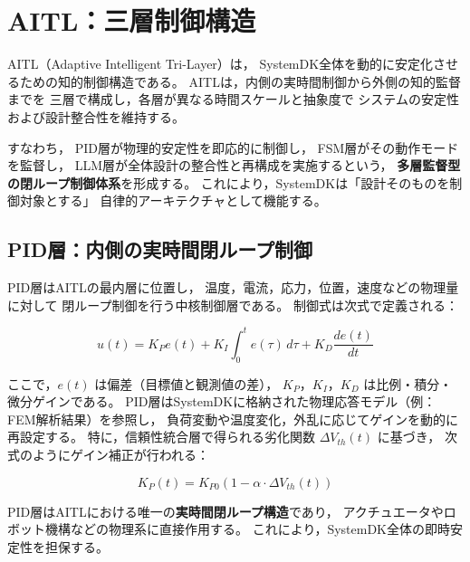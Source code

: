 \section{AITL：三層制御構造}

AITL（Adaptive Intelligent Tri-Layer）は，
SystemDK全体を動的に安定化させるための知的制御構造である。
AITLは，内側の実時間制御から外側の知的監督までを
三層で構成し，各層が異なる時間スケールと抽象度で
システムの安定性および設計整合性を維持する。

すなわち，
PID層が物理的安定性を即応的に制御し，
FSM層がその動作モードを監督し，
LLM層が全体設計の整合性と再構成を実施するという，
\textbf{多層監督型の閉ループ制御体系}を形成する。
これにより，SystemDKは「設計そのものを制御対象とする」
自律的アーキテクチャとして機能する。

\subsection{PID層：内側の実時間閉ループ制御}
PID層はAITLの最内層に位置し，
温度，電流，応力，位置，速度などの物理量に対して
閉ループ制御を行う中核制御層である。
制御式は次式で定義される：

\begin{equation}
u(t) = K_P e(t) + K_I \int_{0}^{t} e(\tau)\,d\tau + K_D \frac{de(t)}{dt}
\label{eq:PID}
\end{equation}

ここで，$e(t)$ は偏差（目標値と観測値の差），
$K_P$，$K_I$，$K_D$ は比例・積分・微分ゲインである。
PID層はSystemDKに格納された物理応答モデル（例：FEM解析結果）を参照し，
負荷変動や温度変化，外乱に応じてゲインを動的に再設定する。
特に，信頼性統合層で得られる劣化関数
$\Delta V_{th}(t)$ に基づき，
次式のようにゲイン補正が行われる：

\begin{equation}
K_P(t) = K_{P0} \left(1 - \alpha \cdot \Delta V_{th}(t)\right)
\label{eq:gainupdate}
\end{equation}

PID層はAITLにおける唯一の\textbf{実時間閉ループ構造}であり，
アクチュエータやロボット機構などの物理系に直接作用する。
これにより，SystemDK全体の即時安定性を担保する。

